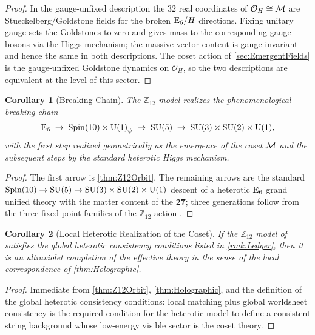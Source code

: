 \documentclass[pdflatex,sn-mathphys-num]{sn-jnl}
\theoremstyle{thmstyleone}
\newtheorem{corollary}[corollary]{Corollary}
\theoremstyle{thmstylethree}%
\theoremstyle{thmstyletwo}%
\begin{document}
\begin{proof}
In the gauge-unfixed description the $32$ real coordinates of
$\mathcal O_{H}\cong\mathcal{M}$ are Stueckelberg/Goldstone fields for the broken
$\mathrm{E}_{6}/H$ directions.  Fixing unitary gauge sets the Goldstones to zero and gives
mass to the corresponding gauge bosons via the Higgs mechanism; the massive
vector content is gauge-invariant and hence the same in both descriptions. The
coset action of \autoref{sec:EmergentFields} is the gauge-unfixed
Goldstone dynamics on $\mathcal O_{H}$, so the two descriptions are equivalent
at the level of this sector.
\end{proof}

\begin{corollary}[Breaking Chain]
\label{cor:BreakingChain}
The $\mathbb Z_{12}$ model realizes the phenomenological breaking chain
\[
  \mathrm{E}_{6}\;\to\;\operatorname{Spin}(10) \times \mathrm{U(1)}_\psi\;\to\;\mathrm{SU(5)}\;\to\;\mathrm{SU(3)}\times\mathrm{SU(2)}\times\mathrm{U(1)},
\]
with the first step realized geometrically as the emergence of the coset
$\mathcal{M}$ and the subsequent steps by the standard heterotic Higgs mechanism.
\end{corollary}

\begin{proof}
The first arrow is \autoref{thm:Z12Orbit}.  The remaining arrows are the
standard $\operatorname{Spin}(10)\to\mathrm{SU(5)}\to\mathrm{SU(3)}\times\mathrm{SU(2)}\times\mathrm{U(1)}$ descent of a heterotic $\mathrm{E}_{6}$ grand
unified theory with the matter content of the $\mathbf{27}$; three generations follow
from the three fixed-point families of the $\mathbb Z_{12}$ action
\cite{Z12Heterotic}.
\end{proof}

\begin{corollary}[Local Heterotic Realization of the Coset]
\label{cor:UVComplete}
If the $\mathbb Z_{12}$ model of \cite{Z12Heterotic} satisfies the global
heterotic consistency conditions listed in \autoref{rmk:Ledger}, then it is an
ultraviolet completion of the effective theory in the sense of the local
correspondence of \autoref{thm:Holographic}.
\end{corollary}

\begin{proof}
Immediate from \autoref{thm:Z12Orbit}, \autoref{thm:Holographic}, and the
definition of the global heterotic consistency conditions: local matching plus
global worldsheet consistency is the required condition for the heterotic model
to define a consistent string background whose low-energy visible sector is the
coset theory.
\end{proof}
\end{document}
